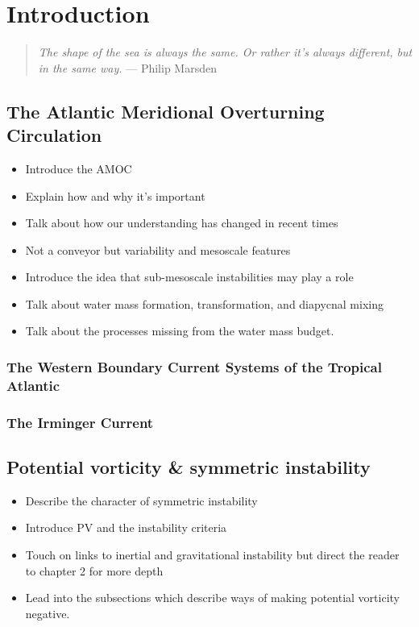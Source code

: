 \chapter{Introduction}
\begin{quote}
\textit{The shape of the sea is always the same. Or rather it's always different, but in the same way.} --- Philip Marsden
\end{quote}

\section{The Atlantic Meridional Overturning Circulation}
\begin{itemize}
    \item Introduce the AMOC
    \item Explain how and why it's important
    \item Talk about how our understanding has changed in recent times
    \item Not a conveyor but variability and mesoscale features
    \item Introduce the idea that sub-mesoscale instabilities may play a role
    \item Talk about water mass formation, transformation, and diapycnal mixing
    \item Talk about the processes missing from the water mass budget.
\end{itemize}

\subsection{The Western Boundary Current Systems of  the Tropical Atlantic}

\subsection{The Irminger Current}

\section{Potential vorticity \& symmetric instability}
\begin{itemize}
    \item Describe the character of symmetric instability
    \item Introduce PV and the instability criteria
    \item Touch on links to inertial and gravitational instability but direct the reader to chapter 2 for more depth
    \item Lead into the subsections which describe ways of making potential vorticity negative.
\end{itemize}

